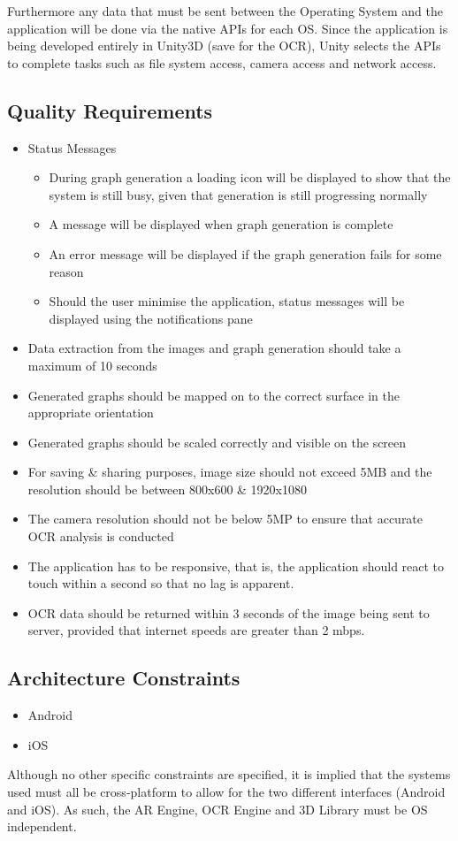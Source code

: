 \documentclass[a4paper,12pt]{article}
\begin{document}
Furthermore any data that must be sent between the Operating System and the application will be done via the native APIs for each OS. Since the application is being developed entirely in Unity3D (save for the OCR), Unity selects the APIs to complete tasks such as file system access, camera access and network access.
\subsection{Quality Requirements}

\begin{itemize}
	\item Status Messages
		\begin{itemize}
			\item During graph generation a loading icon will be displayed to show that the system is still busy, given that generation is still progressing normally
			\item A message will be displayed when graph generation is complete
			\item An error message will be displayed if the graph generation fails for some reason
			\item Should the user minimise the application, status messages will be displayed using the notifications pane
		\end{itemize}
		
	\item Data extraction from the images and graph generation should take a maximum of 10 seconds
	\item Generated graphs should be mapped on to the correct surface in the appropriate orientation
	\item Generated graphs should be scaled correctly and visible on the screen
\item For saving \& sharing purposes, image size should not exceed 5MB and the  resolution should be between 800x600 \& 1920x1080
	\item The camera resolution should not be below 5MP to ensure that accurate OCR analysis is conducted
	\item The application has to be responsive, that is, the application should react to touch within a second so that no lag is apparent.
	\item OCR data should be returned within 3 seconds of the image being sent to server, provided that internet speeds are greater than 2 mbps.
\end{itemize}

\subsection{Architecture Constraints}
\begin{itemize}
	\item Android
	\item iOS
\end{itemize}
Although no other specific constraints are specified, it is implied that the systems used must all be cross-platform to allow for the two different interfaces (Android and iOS). As such, the AR Engine, OCR Engine and 3D Library must be OS independent.
\end{document}
